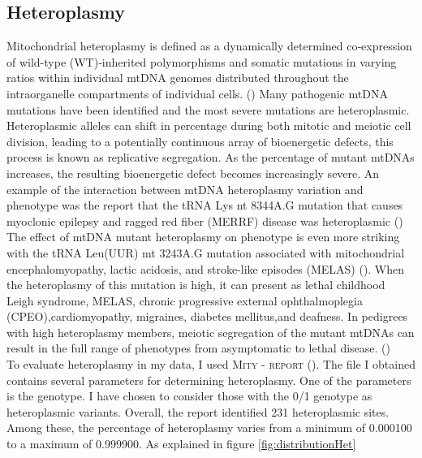 \subsection{Heteroplasmy}


Mitochondrial heteroplasmy is defined as a dynamically determined co‐expression of wild-type (WT)‐inherited polymorphisms and somatic mutations in varying ratios within individual mtDNA genomes distributed throughout the intraorganelle compartments of individual cells. (\cite{stefano2016mitochondrial})
Many pathogenic mtDNA mutations have been identified and the most severe mutations are heteroplasmic.
Heteroplasmic alleles can shift in percentage during both mitotic and meiotic cell division, leading to a potentially continuous
array of bioenergetic defects, this process is known as replicative segregation. As the percentage of mutant mtDNAs increases, the resulting bioenergetic defect becomes increasingly severe. An example of the interaction between mtDNA heteroplasmy variation and phenotype was the report that the tRNA Lys nt 8344A.G  mutation that causes myoclonic epilepsy and ragged red fiber (MERRF) disease was heteroplasmic (\cite{wallace2013mitochondrial}) \\
The effect of mtDNA mutant heteroplasmy on phenotype is even more striking with the tRNA Leu(UUR) mt 3243A.G mutation associated with mitochondrial encephalomyopathy, lactic acidosis, and stroke-like episodes (MELAS) (\cite{goto2011dynamics}). When the heteroplasmy of this mutation is high, it can present as lethal childhood Leigh syndrome, MELAS, chronic progressive external ophthalmoplegia (CPEO),cardiomyopathy, migraines, diabetes mellitus,and deafness. In pedigrees with high heteroplasmy members, meiotic segregation of the mutant mtDNAs can result in the full range of phenotypes from asymptomatic to lethal disease.
(\cite{wallace2013mitochondrial})\\

To evaluate heteroplasmy in my data, I used \textsc{Mity - report} (\cite{puttick2019mity}). 
The file I obtained contains several parameters for determining heteroplasmy. One of the parameters is the genotype. I have chosen to consider those with the 0/1 genotype as heteroplasmic variants. Overall, the report identified 231 heteroplasmic sites. Among these, the percentage of heteroplasmy varies from a minimum of 0.000100  to a maximum of 0.999900.
As explained in figure \ref{fig:distributionHet} 

